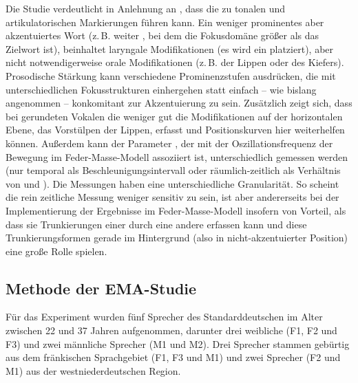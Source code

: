 Die Studie verdeutlicht in Anlehnung an \citet{Mücke2014b}, dass die  zu tonalen und artikulatorischen Markierungen führen kann. Ein weniger prominentes aber akzentuiertes Wort (z.\,B. weiter , bei dem die Fokusdomäne größer als das Zielwort ist), beinhaltet laryngale Modifikationen (es wird ein  platziert), aber nicht notwendigerweise orale Modifikationen (z.\,B. der Lippen oder des Kiefers). Prosodische Stärkung kann verschiedene Prominenzstufen ausdrücken, die mit unterschiedlichen Fokusstrukturen einhergehen \citep[fokale , vgl.][]{Beckman2010} statt einfach -- wie bislang angenommen --  konkomitant zur Akzentuierung zu sein. Zusätzlich zeigt sich, dass bei gerundeten Vokalen die  weniger gut die Modifikationen auf der horizontalen Ebene, das Vorstülpen der Lippen, erfasst und Positionskurven hier weiterhelfen können. Außerdem kann der Parameter , der mit der Oszillationsfrequenz der Bewegung im Feder-Masse-Modell assoziiert ist, unterschiedlich gemessen werden (nur temporal als Beschleunigungsintervall oder räumlich-zeitlich als Verhältnis von  und ). Die Messungen haben eine unterschiedliche Granularität. So scheint die rein zeitliche Messung weniger sensitiv zu sein, ist aber andererseits bei der Implementierung der Ergebnisse im Feder-Masse-Modell insofern von Vorteil, als dass sie Trunkierungen einer  durch eine andere erfassen kann und diese Trunkierungsformen gerade im Hintergrund (also in nicht-akzentuierter Position) eine große Rolle spielen.

\subsection{Methode der EMA-Studie}
\label{subsec:060301}
\largerpage
Für das Experiment wurden fünf Sprecher des Standarddeutschen im Alter zwischen 22 und 37 Jahren aufgenommen, darunter drei weibliche (F1, F2 und F3) und zwei männliche Sprecher (M1 und M2). Drei Sprecher stammen gebürtig aus dem fränkischen Sprachgebiet (F1, F3 und M1) und zwei Sprecher (F2 und M1) aus der westniederdeutschen Region. 

